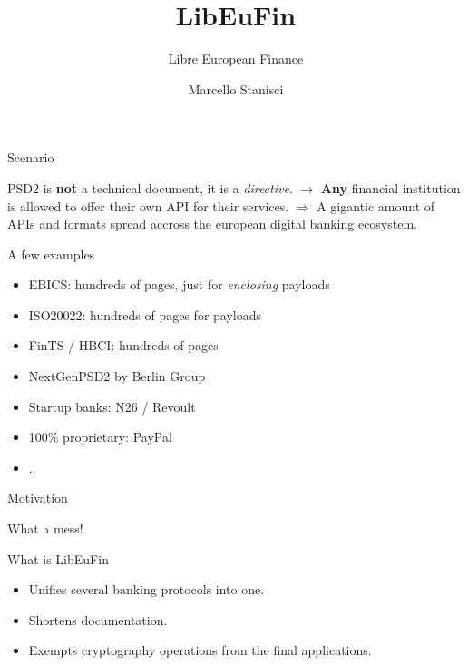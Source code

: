\documentclass[pdf]{beamer}
\title{LibEuFin}
\subtitle{Libre European Finance}
\author{Marcello Stanisci}
\begin{document}
\begin{frame}
  \titlepage
\end{frame}

\begin{frame}{Scenario}

  \begin{center}
  PSD2 is \textbf{not} a technical document, \iffalse (EXPLAIN) \fi
  it is a {\it directive}. \iffalse (EXPLAIN) \fi \newline
  $\rightarrow$ \textbf{Any} financial institution is allowed to offer their
  own API for their services. \newline
  $\Rightarrow$ A gigantic amount of APIs and formats spread accross the
  european digital banking ecosystem.
  \end{center}
\end{frame}

\begin{frame}{A few examples}
  \begin{itemize}
    \item EBICS: hundreds of pages, just for {\it enclosing} payloads
    \item ISO20022: hundreds of pages for payloads
    \item FinTS / HBCI: hundreds of pages
    \item NextGenPSD2 by Berlin Group 
    \item Startup banks: N26 / Revoult
    \item 100\% proprietary: PayPal
    \item ..
  \end{itemize}
\end{frame}

\begin{frame}{Motivation}
  \begin{center}
  What a mess!
  \end{center}
\end{frame}

\begin{frame}{What is LibEuFin}
  \begin{itemize}
  \item Unifies several banking protocols into one.
  \item Shortens documentation.
  \item Exempts cryptography operations from the final applications.
  \end{itemize}
\end{frame}
\end{document}
